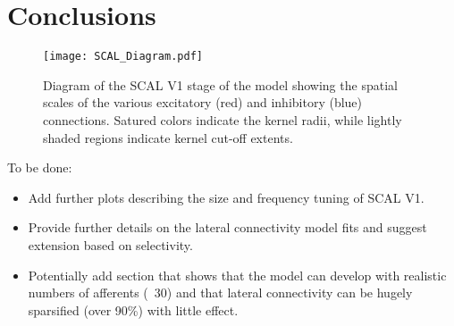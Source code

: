 \section{Conclusions}

\begin{figure}
	\centering
        \texttt{[image: SCAL\_Diagram.pdf]}
	\caption{Diagram of the SCAL V1 stage of the model showing
          the spatial scales of the various excitatory (red) and
          inhibitory (blue) connections. Satured colors indicate the
          kernel radii, while lightly shaded regions indicate kernel
          cut-off extents.}
	\label{SCALDiagram}
\end{figure}


To be done:

\begin{itemize}
  \item Add further plots describing the size and frequency tuning of SCAL V1.
  \item Provide further details on the lateral connectivity model fits and suggest extension based on selectivity.
  \item Potentially add section that shows that the model can develop with realistic numbers of afferents (~30) and that lateral connectivity can be hugely sparsified (over 90\%) with little effect.
\end{itemize}

